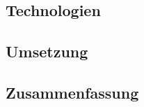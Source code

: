 \begin{spacing}{1}
	\chapter{Technologien}\label{chapter:tech}
\end{spacing}


\begin{spacing}{1}
	\chapter{Umsetzung}\label{chapter:implementation}
\end{spacing}


\begin{spacing}{1}
	\chapter{Zusammenfassung}
\end{spacing}


\newpage
{}
\setcounter{page}{\value{RPages}}

\glsnogroupskiptrue
\printglossary[title=Glossar,toctitle=Glossar] %
\listoffigures
\listoftables
\lstlistoflistings
\appendix
{}



